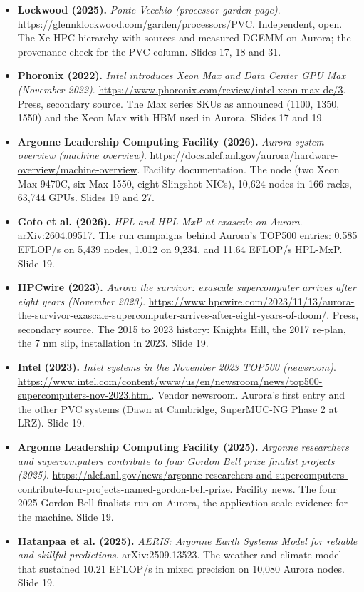 \documentclass[11pt,letterpaper]{article}
\begin{document}
\begin{itemize}[leftmargin=1.2em,itemsep=3pt]
\item \textbf{Lockwood (2025).} \textit{Ponte Vecchio (processor garden page)}. \url{https://glennklockwood.com/garden/processors/PVC}. Independent, open. The Xe-HPC hierarchy with sources and measured DGEMM on Aurora; the provenance check for the PVC column. Slides 17, 18 and 31.
\item \textbf{Phoronix (2022).} \textit{Intel introduces Xeon Max and Data Center GPU Max (November 2022)}. \url{https://www.phoronix.com/review/intel-xeon-max-dc/3}. Press, secondary source. The Max series SKUs as announced (1100, 1350, 1550) and the Xeon Max with HBM used in Aurora. Slides 17 and 19.
\item \textbf{Argonne Leadership Computing Facility (2026).} \textit{Aurora system overview (machine overview)}. \url{https://docs.alcf.anl.gov/aurora/hardware-overview/machine-overview}. Facility documentation. The node (two Xeon Max 9470C, six Max 1550, eight Slingshot NICs), 10,624 nodes in 166 racks, 63,744 GPUs. Slides 19 and 27.
\item \textbf{Goto et al. (2026).} \textit{HPL and HPL-MxP at exascale on Aurora}. arXiv:2604.09517. The run campaigns behind Aurora's TOP500 entries: 0.585 EFLOP/s on 5,439 nodes, 1.012 on 9,234, and 11.64 EFLOP/s HPL-MxP. Slide 19.
\item \textbf{HPCwire (2023).} \textit{Aurora the survivor: exascale supercomputer arrives after eight years (November 2023)}. \url{https://www.hpcwire.com/2023/11/13/aurora-the-survivor-exascale-supercomputer-arrives-after-eight-years-of-doom/}. Press, secondary source. The 2015 to 2023 history: Knights Hill, the 2017 re-plan, the 7 nm slip, installation in 2023. Slide 19.
\item \textbf{Intel (2023).} \textit{Intel systems in the November 2023 TOP500 (newsroom)}. \url{https://www.intel.com/content/www/us/en/newsroom/news/top500-supercomputers-nov-2023.html}. Vendor newsroom. Aurora's first entry and the other PVC systems (Dawn at Cambridge, SuperMUC-NG Phase 2 at LRZ). Slide 19.
\item \textbf{Argonne Leadership Computing Facility (2025).} \textit{Argonne researchers and supercomputers contribute to four Gordon Bell prize finalist projects (2025)}. \url{https://alcf.anl.gov/news/argonne-researchers-and-supercomputers-contribute-four-projects-named-gordon-bell-prize}. Facility news. The four 2025 Gordon Bell finalists run on Aurora, the application-scale evidence for the machine. Slide 19.
\item \textbf{Hatanpaa et al. (2025).} \textit{AERIS: Argonne Earth Systems Model for reliable and skillful predictions}. arXiv:2509.13523. The weather and climate model that sustained 10.21 EFLOP/s in mixed precision on 10,080 Aurora nodes. Slide 19.

\end{itemize}
\end{document}
